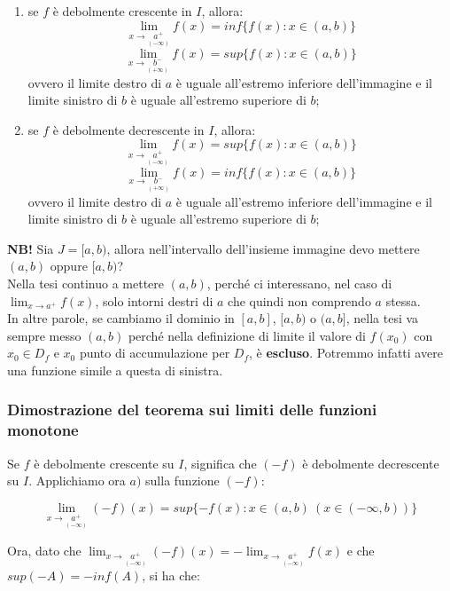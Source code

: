 \documentclass{article}
\begin{document}
\begin{enumerate}[label=\alph{enumi})]
    \item se $f$ è debolmente crescente in $I$, allora: $$\lim_{x \to \underset{\scriptstyle (-\infty)}{a^+}} f(x) = inf\{f(x) : x \in (a, b)\}$$ $$\lim_{x \to \underset{\scriptstyle (+\infty)}{b^-}} f(x) = sup\{f(x) : x \in (a, b)\}$$ ovvero il limite destro di $a$ è uguale all'estremo inferiore dell'immagine e il limite sinistro di $b$ è uguale all'estremo superiore di $b$;
    \item se $f$ è debolmente decrescente in $I$, allora: $$\lim_{x \to \underset{\scriptstyle (-\infty)}{a^+}} f(x) = sup\{f(x) : x \in (a, b)\}$$ $$\lim_{x \to \underset{\scriptstyle (+\infty)}{b^-}} f(x) = inf\{f(x) : x \in (a, b)\}$$ ovvero il limite destro di $a$ è uguale all'estremo inferiore dell'immagine e il limite sinistro di $b$ è uguale all'estremo superiore di $b$;
\end{enumerate}

\noindent\textbf{NB!} Sia $J = [a, b)$, allora nell'intervallo dell'insieme immagine devo mettere $(a, b)$ oppure $[a, b)$? \\
Nella tesi continuo a mettere $(a, b)$, perché ci interessano, nel caso di $\lim_{x \to a^+} f(x)$, solo intorni destri di $a$ che quindi non comprendo $a$ stessa. \\
In altre parole, se cambiamo il dominio in $[a, b]$, $[a, b)$ o $(a, b]$, nella tesi va sempre messo $(a, b)$ perché nella definizione di limite il valore di $f(x_0)$ con $x_0 \in D_f$ e $x_0$ punto di accumulazione per $D_f$, è \textbf{escluso}. Potremmo infatti avere una funzione simile a questa di sinistra.

\subsubsection{Dimostrazione del teorema sui limiti delle funzioni monotone}
Se $f$ è debolmente crescente su $I$, significa che $(-f)$ è debolmente decrescente su $I$. Applichiamo ora $a)$ sulla funzione $(-f)$:

\begin{equation*}
    \lim_{x \to \underset{\scriptstyle (-\infty)}{a^+}} (-f)(x) = sup\{-f(x) : x \in (a, b) \ (x \in (-\infty, b))\}
\end{equation*}

\noindent Ora, dato che $\lim_{x \to \underset{\scriptstyle (-\infty)}{a^+}} (-f)(x) = - \lim_{x \to \underset{\scriptstyle (-\infty)}{a^+}} f(x)$ e che $sup(-A) = -inf(A)$, si ha che:
\end{document}
